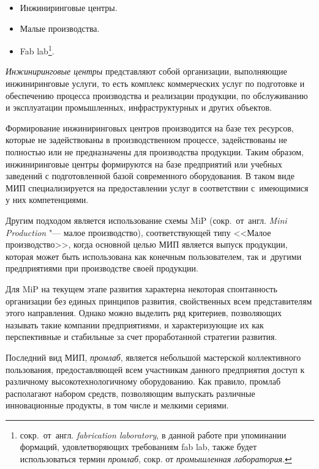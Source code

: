 \begin{itemize}
	\item Инжиниринговые центры.
	
	\item Малые производства.
	
	\item Fab lab\footnote{сокр.~от~англ. \textit{fabrication laboratory}, в данной работе при упоминании формаций, удовлетворяющих требованиям fab lab, также будет использоваться термин \textit{промлаб}, сокр. от \textit{промышленная лаборатория}.}.
	\end{itemize}

\textit{Инжиниринговые центры} представляют собой организации, выполняющие инжиниринговые услуги, то есть комплекс коммерческих услуг по подготовке и обеспечению процесса производства и реализации продукции, по обслуживанию и эксплуатации промышленных, инфраструктурных и других объектов.

Формирование инжиниринговых центров производится на базе тех ресурсов, которые не задействованы в производственном процессе, задействованы не полностью или не предназначены для производства продукции. Таким образом, инжиниринговые центры формируются на базе предприятий или учебных заведений с подготовленной базой современного оборудования. В таком виде МИП специализируется на предоставлении услуг в соответствии с~имеющимися у них компетенциями.

Другим подходом является использование схемы MiP (сокр.~от~англ. \textit{Mini Production} "--- малое производство), соответствующей типу <<Малое производство>>, когда основной целью МИП является выпуск продукции, которая может быть использована как конечным пользователем, так и~другими предприятиями при производстве своей продукции.

Для MiP на текущем этапе развития характерна некоторая спонтанность организации без единых принципов развития, свойственных всем представителям этого направления. Однако можно выделить ряд критериев, позволяющих называть такие компании предприятиями, и характеризующие их как перспективные и стабильные за счет проработанной стратегии развития.

Последний вид МИП, \textit{промлаб}, является небольшой мастерской коллективного пользования, предоставляющей всем участникам данного предприятия доступ к различному высокотехнологичному оборудованию. Как правило, промлаб располагают набором средств, позволяющим выпускать различные инновационные продукты, в том числе и мелкими сериями. 

